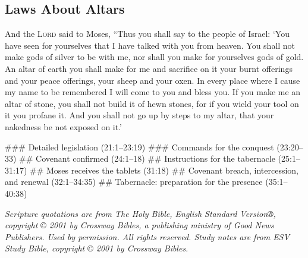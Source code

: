 \documentclass{bible-study-handout}
\begin{document}
\subsection{Laws About Altars}

And the \textsc{Lord} said to Moses, “Thus you shall say to the people of Israel: ‘You have seen for yourselves that I have talked with you from heaven. You shall not make gods of silver to be with me, nor shall you make for yourselves gods of gold. An altar of earth you shall make for me and sacrifice on it your burnt offerings and your peace offerings, your sheep and your oxen. In every place where I cause my name to be remembered I will come to you and bless you. If you make me an altar of stone, you shall not build it of hewn stones, for if you wield your tool on it you profane it. And you shall not go up by steps to my altar, that your nakedness be not exposed on it.’

\begin{bookoutline}
### Detailed legislation (21:1–23:19)
### Commands for the conquest (23:20–33)
## Covenant confirmed (24:1–18)
## Instructions for the tabernacle (25:1–31:17)
## Moses receives the tablets (31:18)
## Covenant breach, intercession, and renewal (32:1–34:35)
## Tabernacle: preparation for the presence (35:1–40:38)
\end{bookoutline}

\begin{fullwidth}
\bigskip\scriptsize\textit{Scripture quotations are from The Holy Bible, English Standard Version®, copyright © 2001 by Crossway Bibles, a publishing ministry of Good News Publishers. Used by permission. All rights reserved. Study notes are from ESV Study Bible, copyright © 2001 by Crossway Bibles.}
\end{fullwidth}
\end{document}
